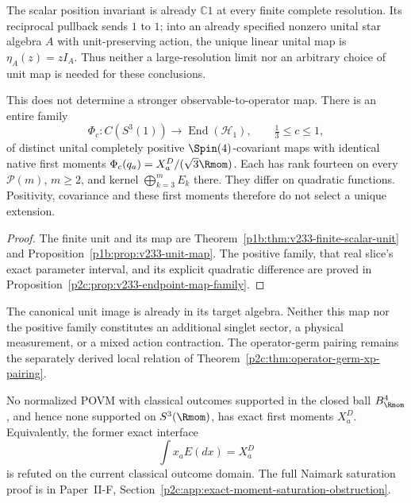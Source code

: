 \documentclass[12pt,a4paper]{article}
\begin{document}
\begin{proposition}
\label{p2c:prop:v233-unit-and-positive-maps}
The scalar position invariant is already \(\mathbb C1\) at every
finite complete resolution. Its reciprocal pullback sends \(1\) to
\(1\); into an already specified nonzero unital star algebra \(A\)
with unit-preserving action, the unique linear unital map is
\(\eta_A(z)=zI_A\).
Thus neither a large-resolution limit nor an arbitrary choice of
unit map is needed for these conclusions.

This does not determine a stronger observable-to-operator map.
There is an entire family
\[
 \Phi_c:C(S^3(1))\longrightarrow\operatorname{End}(\mathcal H_1),
 \qquad \tfrac13\le c\le1,
\]
of distinct unital completely positive \(\Spin(4)\)-covariant maps
with identical native first moments
\(\Phi_c(q_a)=X_a^D/(\sqrt3\Rmom)\).
Each has rank fourteen on every \(\mathcal P(m)\), \(m\ge2\), and
kernel \(\bigoplus_{k=3}^mE_k\) there.
They differ on quadratic functions. Positivity, covariance and these
first moments therefore do not select a unique extension.
\end{proposition}
\begin{proof}
The finite unit and its map are
Theorem~\ref{p1b:thm:v233-finite-scalar-unit} and
Proposition~\ref{p1b:prop:v233-unit-map}. The positive family,
that real slice's exact parameter interval, and its explicit quadratic
difference are proved in
Proposition~\ref{p2c:prop:v233-endpoint-map-family}.
\end{proof}

The canonical unit image is already in its target algebra. Neither
this map nor the positive family constitutes an additional singlet
sector, a physical measurement, or a mixed action contraction.
The operator-germ pairing remains the separately derived local
relation of Theorem~\ref{p2c:thm:operator-germ-xp-pairing}.


\begin{proposition}
\label{p2c:prop:exact-intrinsic-classical-moment-no-go}
No normalized POVM with classical outcomes supported in the closed ball
\(B_{\Rmom}^4\), and hence none supported on \(S^3(\Rmom)\), has exact first
moments \(X_a^D\).  Equivalently, the former exact interface
\[
 \int x_aE(dx)=X_a^D
\]
is refuted on the current classical outcome domain.  The full Naimark
saturation proof is in
Paper~II-F, Section~\ref{p2c:app:exact-moment-saturation-obstruction}.
\end{proposition}
\end{document}
